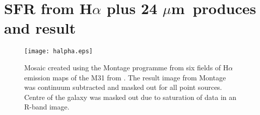 \documentclass[useAMS,usenatbib]{mn2e}
\newcommand \um    {$\mu$m\ }
\begin{document}


\appendix
\section{SFR from H$\alpha$ plus 24 \um produces and result}
\label{app:halpha}

\begin{figure*}
\centering
\texttt{[image: halpha.eps]}
\caption{Mosaic created using the Montage programme from six fields of H$\alpha$ emission maps of the M31 from \cite{Massey07}. The result image from Montage was continuum subtracted and masked out for all point sources. Centre of the galaxy was masked out due to saturation of data in an R-band image.}
\label{fig:halpha}
\end{figure*}
\end{document}
